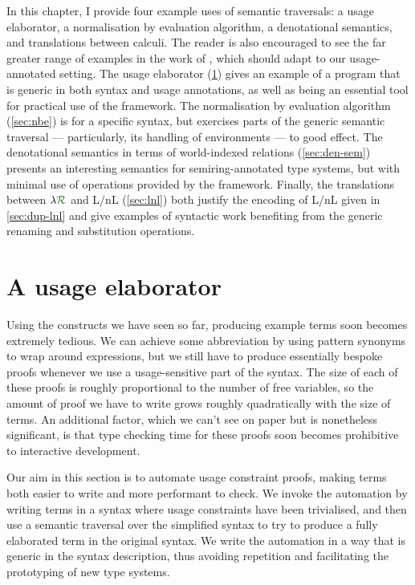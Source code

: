 In this chapter, I provide four example uses of semantic traversals:
a usage elaborator, a normalisation by evaluation algorithm, a denotational
semantics, and translations between calculi.
The reader is also encouraged to see the far greater range of examples in the
work of \citet{AACMM21}, which should adapt to our usage-annotated setting.
The usage elaborator (\cref{sec:usage-elaborator}) gives an example of a program
that is generic in both syntax and usage annotations, as well as being an
essential tool for practical use of the framework.
The normalisation by evaluation algorithm (\cref{sec:nbe}) is for a specific
syntax, but exercises parts of the generic semantic traversal --- particularly,
its handling of environments --- to good effect.
The denotational semantics in terms of world-indexed relations
(\cref{sec:den-sem}) presents an interesting semantics for semiring-annotated
type systems, but with minimal use of operations provided by the framework.
Finally, the translations between $\name$ and L/nL (\cref{sec:lnl}) both justify
the encoding of L/nL given in \cref{sec:dup-lnl} and give examples of syntactic
work benefiting from the generic renaming and substitution operations.


\section{A usage elaborator}\label{sec:usage-elaborator}

Using the constructs we have seen so far, producing example terms soon becomes
extremely tedious.
We can achieve some abbreviation by using pattern synonyms to wrap around
 expressions, but we still have to
produce essentially bespoke proofs whenever we use a usage-sensitive part of the
syntax.
The size of each of these proofs is roughly proportional to the number of free
variables, so the amount of proof we have to write grows roughly quadratically
with the size of terms.
An additional factor, which we can't see on paper but is nonetheless
significant, is that type checking time
for these proofs soon becomes prohibitive to interactive development.

Our aim in this section is to automate usage constraint proofs, making terms
both easier to write and more performant to check.
We invoke the automation by writing terms in a syntax where usage constraints
have been trivialised, and then use a semantic traversal over the simplified
syntax to try to produce a fully elaborated term in the original syntax.
We write the automation in a way that is generic in the syntax description, thus
avoiding repetition and facilitating the prototyping of new type systems.

